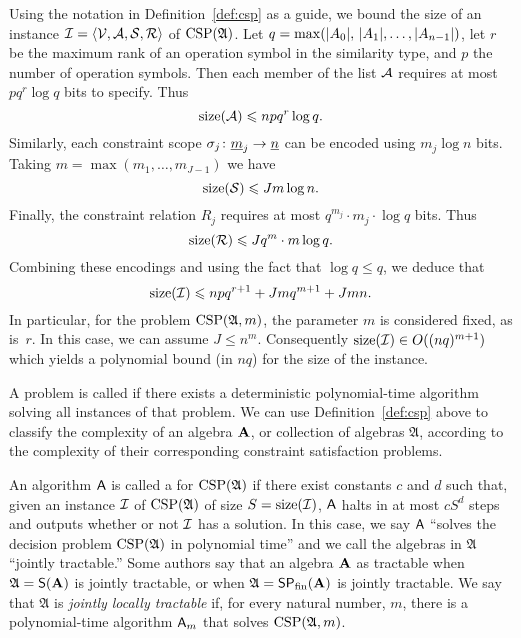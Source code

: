 Using the notation in Definition~\ref{def:csp} as a guide, we bound the size of an instance $\mathcal{I}=\langle\mathcal{V}, \mathcal{A}, \mathcal{S}, \mathcal{R}\rangle$ of $\operatorname{CSP}(\mathfrak A)$. Let $q=\max(|A_0|,\, |A_1|,\dots,|A_{n-1}|)$, let $r$ be the maximum rank of an operation symbol in the similarity type, and $p$ the number of operation symbols. Then each member of the list $\mathcal{A}$ requires at most $pq^r\log q$ bits to specify. Thus
\begin{equation*}
\operatorname{size}(\mathcal{A}) \leqslant npq^r\log q.
\end{equation*}
Similarly, each constraint scope $\sigma_j\colon \underline{m}_j \to \underline{n}$ can be encoded using $m_j\log n$ bits. Taking $m=\max(m_1,\dots,m_{J-1})$ we have
\begin{equation*}
\operatorname{size}(\mathcal{S}) \leqslant Jm\log n.
\end{equation*}
Finally, the constraint relation $R_j$ requires at most $q^{m_j}\cdot m_j \cdot \log q$ bits. Thus
\begin{equation*}
\operatorname{size}(\mathcal{R}) \leqslant Jq^m\cdot m\log q.
\end{equation*}
Combining these encodings and using the fact that $\log q \leq q$, we deduce that
\begin{equation}\label{eqn:size}
\size(\sI) \leq npq^{r+1} + Jmq^{m+1} + Jmn. 
\end{equation}
In particular, for the problem $\operatorname{CSP}(\mathfrak A,m)$, the parameter $m$ is considered fixed, as is~$r$.
In this case, we can assume $J\leq n^m$. Consequently $\operatorname{size}(\mathcal{I}) \in O((nq)^{m+1})$ 
which yields a polynomial bound (in $nq$) for the size of the instance.

A problem is called  if there exists a deterministic
polynomial-time algorithm solving all instances of that problem.
We can use Definition~\ref{def:csp} above to classify the complexity of an algebra
$\mathbf{A}$, or collection of algebras $\mathfrak A$, according to the complexity of their
corresponding constraint satisfaction problems.

An algorithm $\mathsf{A}$ is called a 
for $\operatorname{CSP}(\mathfrak A)$ %
if there exist constants $c$ and $d$ such that, given an instance $\mathcal{I}$ of
$\operatorname{CSP}(\mathfrak A)$ of size $S= \operatorname{size}(\mathcal{I})$,
$\mathsf{A}$ halts in at most $c S^d$ steps and outputs
whether or not $\mathcal{I}$ has a solution.  In this case, we say $\mathsf{A}$
``solves the decision problem $\operatorname{CSP}(\mathfrak A)$ in polynomial time''
and we call the algebras in $\mathfrak A$ ``jointly tractable.''
Some authors say that an algebra $\mathbf{A}$ as tractable when
$\mathfrak A = \mathsf{S}(\mathbf{A})$ is jointly tractable,
or when $\mathfrak A = \mathsf{S} \mathsf{P}_{\mathrm{fin}} (\mathbf{A})$
is jointly tractable.
We say that $\mathfrak A$ is \emph{jointly locally tractable} if, for every natural number, $m$, there is a polynomial-time algorithm $\mathsf{A}_m$ that solves $\operatorname{CSP}(\mathfrak A,m)$. 

